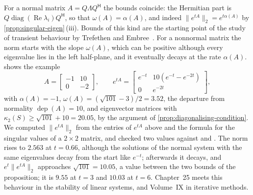 For a normal matrix $A=Q\Lambda Q^{\mathsf H}$ the bounds coincide: the Hermitian part is $Q\operatorname{diag}(\operatorname{Re}\lambda_i)Q^{\mathsf H}$, so that $\omega(A)=\alpha(A)$, and indeed $\|e^{tA}\|_2=e^{t\alpha(A)}$ by \cref{prop:singular-eigen}\,(iii). Bounds of this kind are the starting point of the study of transient behaviour by Trefethen and Embree~\cite{trefethen2005}. For a nonnormal matrix the norm starts with the slope $\omega(A)$, which can be positive although every eigenvalue lies in the left half-plane, and it eventually decays at the rate $\alpha(A)$.  shows the example
\[
A=\begin{bmatrix}-1&10\\0&-2\end{bmatrix},\qquad e^{tA}=\begin{bmatrix}e^{-t}&10(e^{-t}-e^{-2t})\\0&e^{-2t}\end{bmatrix},
\]
with $\alpha(A)=-1$, $\omega(A)=(\sqrt{101}-3)/2=3.52$, the departure from normality $\operatorname{dep}(A)=10$, and eigenvector matrices with $\kappa_2(S)\ge\sqrt{101}+10=20.05$, by the argument of \cref{prop:diagonalising-condition}. We computed $\|e^{tA}\|_2$ from the entries of $e^{tA}$ above and the formula for the singular values of a $2\times2$ matrix, and checked two values against  and . The norm rises to $2.563$ at $t=0.66$, although the solutions of the normal system with the same eigenvalues decay from the start like $e^{-t}$; afterwards it decays, and $e^t\|e^{tA}\|_2$ approaches $\sqrt{101}=10.05$, a value between the two bounds of the proposition; it is $9.55$ at $t=3$ and $10.03$ at $t=6$. Chapter~25 meets this behaviour in the stability of linear systems, and Volume~IX in iterative methods.

